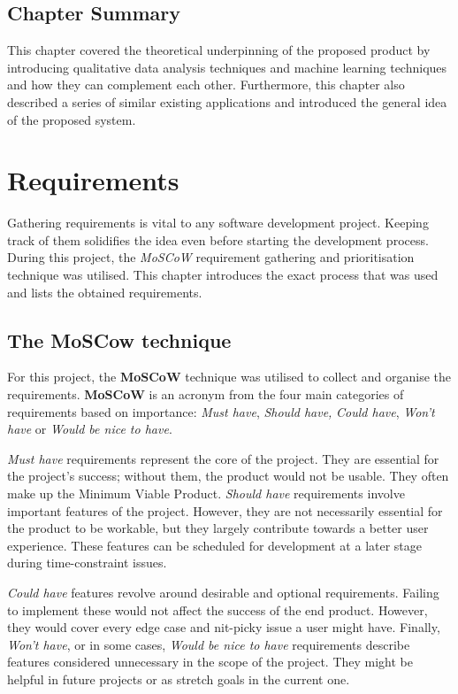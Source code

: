 \documentclass{l4proj}
\begin{document}
\section{Chapter Summary}
This chapter covered the theoretical underpinning of the proposed product by introducing qualitative data analysis techniques and machine learning techniques and how they can complement each other. Furthermore, this chapter also described a series of similar existing applications and introduced the general idea of the proposed system.


\chapter{Requirements}
Gathering requirements is vital to any software development project. Keeping track of them solidifies the idea even before starting the development process. During this project, the \textit{MoSCoW} requirement gathering and prioritisation technique was utilised. This chapter introduces the exact process that was used and lists the obtained requirements.
\section{The MoSCow technique}
For this project, the \textbf{MoSCoW}  technique was utilised to collect and organise the requirements. \textbf{MoSCoW} is an acronym from the four main categories of requirements based on importance: \textit{Must have}, \textit{Should have,} \textit{Could have}, \textit{Won't have} or \textit{Would be nice to have}.

\textit{Must have} requirements represent the core of the project. They are essential for the project's success; without them, the product would not be usable. They often make up the Minimum Viable Product. \textit{Should have} requirements involve important features of the project. However, they are not necessarily essential for the product to be workable, but they largely contribute towards a better user experience. These features can be scheduled for development at a later stage during time-constraint issues.

\textit{Could have} features revolve around desirable and optional requirements. Failing to implement these would not affect the success of the end product. However, they would cover every edge case and nit-picky issue a user might have. Finally, \textit{Won't have}, or in some cases, \textit{Would be nice to have} requirements describe features considered unnecessary in the scope of the project. They might be helpful in future projects or as stretch goals in the current one. 
\end{document}
